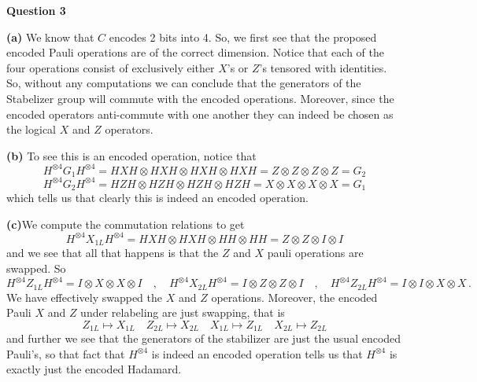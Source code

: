 \documentclass[10pt]{article}
\newcommand{\Que}[1]{\textbf{Question #1}}
\begin{document}
\Que{3}

\textbf{(a)} We know that $C$ encodes 2 bits into 4. So, we first see that the proposed encoded Pauli operations are of the correct dimension. Notice that each of the four operations consist of exclusively either $X$'s or $Z$'s tensored with identities. So, without any computations we can conclude that the generators of the Stabelizer group will commute with the encoded operations. Moreover, since the encoded operators anti-commute with one another they can indeed be chosen as the logical $X$ and $Z$ operators.

\textbf{(b)} To see this is an encoded operation, notice that
\[ H^{\otimes 4}G_{1} H^{\otimes 4} = HXH\otimes HXH\otimes HXH \otimes HXH = Z\otimes Z\otimes Z \otimes Z = G_{2} \]
\[ H^{\otimes 4}G_{2} H^{\otimes 4} = HZH\otimes HZH\otimes HZH \otimes HZH = X\otimes X\otimes X \otimes X = G_{1} \]
which tells us that clearly this is indeed an encoded operation.

\textbf{(c)}We compute the commutation relations to get
\[ H^{\otimes 4}X_{1L}H^{\otimes 4} = HXH\otimes HXH \otimes HH \otimes HH = Z\otimes Z\otimes I\otimes I\]
and we see that all that happens is that the $Z$ and $X$ pauli operations are swapped. So
\[ H^{\otimes 4}Z_{1L}H^{\otimes 4} = I\otimes X \otimes X \otimes I \quad , \quad H^{\otimes 4}X_{2L}H^{\otimes 4} = I\otimes Z \otimes Z \otimes I \quad , \quad H^{\otimes 4}Z_{2L}H^{\otimes 4} = I\otimes I \otimes X \otimes X\, .\]
We have effectively swapped the $X$ and $Z$ operations. Moreover, the encoded Pauli $X$ and $Z$ under relabeling are just swapping, that is
\[ Z_{1L} \mapsto X_{1L} \quad Z_{2L} \mapsto X_{2L} \quad X_{1L} \mapsto Z_{1L} \quad X_{2L} \mapsto Z_{2L} \]
and further we see that the generators of the stabilizer are just the usual encoded Pauli's, so that fact that $H^{\otimes 4}$ is indeed an encoded operation tells us that $H^{\otimes 4}$ is exactly just the encoded Hadamard.
\end{document}
